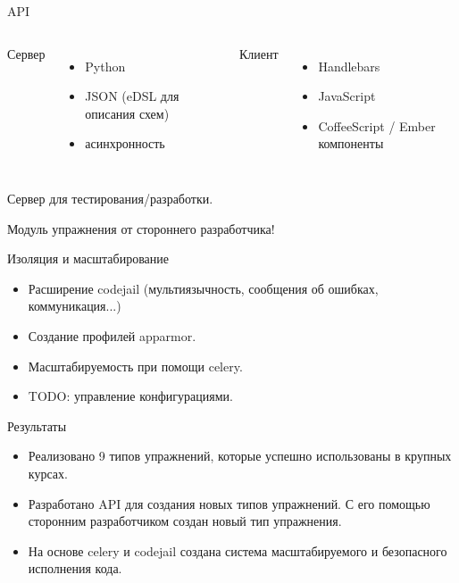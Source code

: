 \documentclass{beamer}
\begin{document}
\begin{frame}{API}
  \begin{columns}[t]
    Сервер
    \begin{itemize}
    \item Python
    \item JSON (eDSL для описания схем)
    \item асинхронность
    \end{itemize}

    Клиент
    \begin{itemize}
    \item Handlebars
    \item JavaScript
    \item CoffeeScript / Ember компоненты
    \end{itemize}
  \end{columns}

  \bigskip

  Сервер для тестирования/разработки.

  \medskip

  Модуль упражнения от стороннего разработчика!
\end{frame}

\begin{frame}{Изоляция и масштабирование}
  \begin{itemize}
  \item Расширение codejail (мультиязычность, сообщения об ошибках,
    коммуникация...)
  \item Создание профилей apparmor.
  \item Масштабируемость при помощи celery.
  \item TODO: управление конфигурациями.
  \end{itemize}
\end{frame}

\begin{frame}{Результаты}
  \begin{itemize}
  \item[\checkmark] Реализовано 9 типов упражнений, которые успешно использованы
    в крупных курсах.
  \item[\checkmark] Разработано API для создания новых типов упражнений. С его
    помощью сторонним разработчиком создан новый тип упражнения.
  \item[\checkmark] На основе celery и codejail создана система масштабируемого и
    безопасного исполнения кода.
  \end{itemize}
\end{frame}
\end{document}

